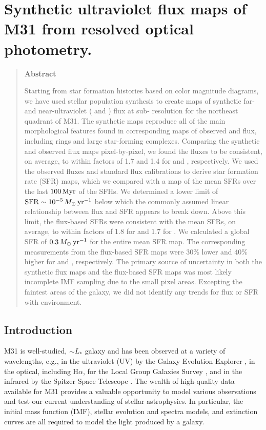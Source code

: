 \chapter{Synthetic ultraviolet flux maps of M31 from resolved optical
    photometry.
}
\label{m31flux}

\begin{quote}
\begin{center}
\textbf{\large Abstract}
\end{center}

Starting from star formation histories based on color magnitude diagrams, we
have used stellar population synthesis to create maps of synthetic far- and
near-ultraviolet (\fuv{} and \nuv{}) flux at sub-\kpc{} resolution for the
northeast quadrant of M31. The synthetic maps reproduce all of the main
morphological features found in corresponding maps of observed \fuv{} and
\nuv{} flux, including rings and large star-forming complexes. Comparing the
synthetic and observed flux maps pixel-by-pixel, we found the fluxes to be
consistent, on average, to within factors of 1.7 and 1.4 for \fuv{} and \nuv{},
respectively. We used the observed fluxes and standard flux calibrations to
derive star formation rate (SFR) maps, which we compared with a map of the mean
SFRs over the last $100\,\mathrm{Myr}$ of the SFHs. We determined a lower limit of $\mathrm{SFR}
\sim 10^{-5}\,M_\odot\,\mathrm{yr}^{-1}$ below which the commonly assumed linear relationship
between flux and SFR appears to break down. Above this limit, the flux-based
SFRs were consistent with the mean SFRs, on average, to within factors of 1.8
for \fuv{} and 1.7 for \nuv{}. We calculated a global SFR of $0.3\,M_\odot\,\mathrm{yr}^{-1}$
for the entire mean SFR map. The corresponding measurements from the flux-based
SFR maps were 30\% lower and 40\% higher for \fuv{} and \nuv{}, respectively.
The primary source of uncertainty in both the synthetic flux maps and the
flux-based SFR maps was most likely incomplete IMF sampling due to the small
pixel areas. Excepting the faintest areas of the galaxy, we did not identify
any trends for flux or SFR with environment.

\end{quote}


\section{Introduction}

M31 is well-studied, $\sim L_\ast$ galaxy and has been observed at a variety of
wavelengths, e.g., in the ultraviolet (UV) by the Galaxy Evolution Explorer
\citep[GALEX;][]{Morrissey:2007}, in the optical, including H$\alpha$, for the
Local Group Galaxies Survey \citep{Massey:2006}, and in the infrared by the
Spitzer Space Telescope \citep{Gordon:2006}. The wealth of high-quality data
available for M31 provides a valuable opportunity to model various observations
and test our current understanding of stellar astrophysics. In particular, the
initial mass function (IMF), stellar evolution and spectra models, and
extinction curves are all required to model the light produced by a galaxy.

